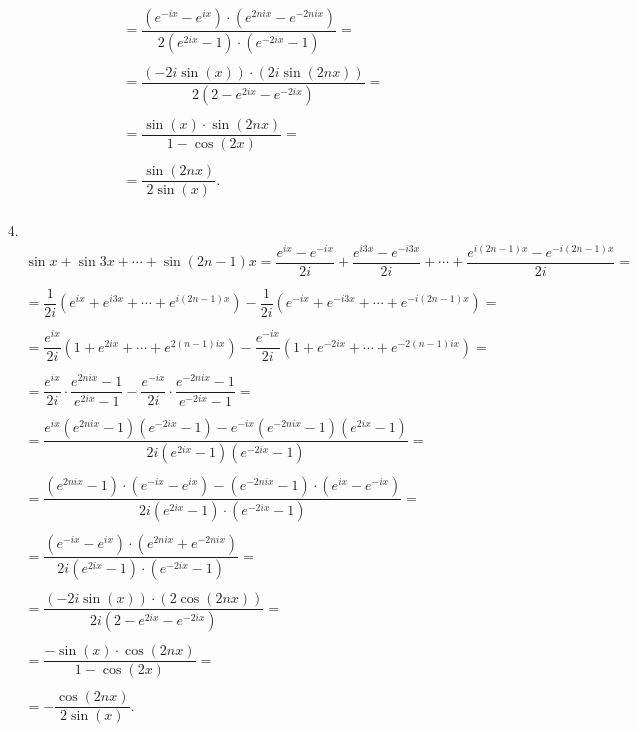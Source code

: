 \begin{solution}
\begin{enumerate}
\begin{align*}
            \\
            &= \dfrac{(e^{-ix} - e^{ix})\cdot(e^{2nix} -e^{-2nix})}{2(e^{2ix} - 1)\cdot(e^{-2ix} - 1)} = \\
            \\
            &= \dfrac{(-2i\sin(x))\cdot(2i \sin(2nx))}{2(2 - e^{2ix} - e^{-2ix})} = \\
            \\
            &= \dfrac{\sin(x)\cdot\sin(2nx)}{1 - \cos (2x)} = \\
            \\
            &= \dfrac{\sin(2nx)}{2 \sin (x)}. \\
        \end{align*}
    
        \item[4.] 
        \begin{align*}
            & \sin x + \sin 3x + \cdots + \sin (2n - 1) x = \dfrac{e^{ix} - e^{-ix}}{2i} + \dfrac{e^{i3x} - e^{-i3x}}{2i} + \cdots + \dfrac{e^{i(2n-1)x} - e^{-i(2n-1)x}}{2i} = \\
            \\
            &= \dfrac1{2i} \left( e^{ix} + e^{i3x} + \cdots + e^{i(2n-1)x} \right) - \dfrac1{2i} \left( e^{-ix} + e^{-i3x} + \cdots + e^{-i(2n-1)x} \right) = \\
            \\
            &= \dfrac{e^{ix}}{2i} \left( 1 + e^{2ix} + \cdots + e^{2(n-1)ix} \right) - \dfrac{e^{-ix}}{2i} \left( 1 + e^{-2ix} + \cdots + e^{-2(n-1)ix} \right) = \\
            \\
            &= \dfrac{e^{ix}}{2i} \cdot \dfrac{e^{2nix} - 1}{e^{2ix} - 1} - \dfrac{e^{-ix}}{2i} \cdot \dfrac{e^{-2nix} - 1}{e^{-2ix} - 1} = \\
            \\
            &= \dfrac{e^{ix}\left(e^{2nix} - 1\right)\left(e^{-2ix} - 1\right) - e^{-ix}\left(e^{-2nix} - 1\right)\left(e^{2ix} - 1\right)}{2i(e^{2ix} - 1)(e^{-2ix} - 1)} = \\
            \\
            &= \dfrac{(e^{2nix} - 1)\cdot (e^{-ix} - e^{ix}) - (e^{-2nix} - 1)\cdot (e^{ix} - e^{-ix})}{2i(e^{2ix} - 1)\cdot (e^{-2ix} - 1)} = \\
            \\
            &= \dfrac{(e^{-ix} - e^{ix})\cdot(e^{2nix} + e^{-2nix})}{2i(e^{2ix} - 1)\cdot(e^{-2ix} - 1)} = \\
            \\
            &= \dfrac{(-2i\sin(x))\cdot(2\cos(2nx))}{2i(2 - e^{2ix} - e^{-2ix})} = \\
            \\
            &= \dfrac{-\sin(x)\cdot\cos(2nx)}{1 - \cos (2x)} = \\
            \\
            &= -\dfrac{\cos(2nx)}{2 \sin (x)}. \\
        \end{align*}
    \end{enumerate}


\end{solution}
